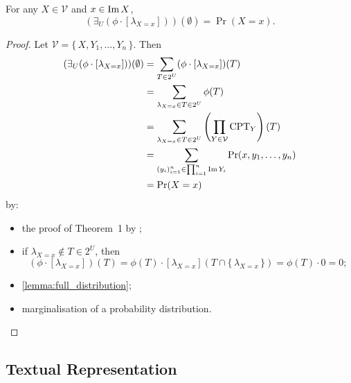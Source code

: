 \begin{theorem}\label{thm:correctness}
  For any $X \in \mathcal{V}$ and $x \in \operatorname{Im} X$,
  \[
    (\exists_U(\phi \cdot [\lambda_{X=x}]))(\emptyset) = \Pr(X = x).
  \]
\end{theorem}
\begin{proof}
  Let $\mathcal{V} = \{\, X, Y_1, \dots, Y_n \,\}$. Then
  \begin{align*}
    (\exists_U (\phi \cdot [\lambda_{X=x}]))(\emptyset) &= \sum_{T \in 2^U} (\phi \cdot [\lambda_{X=x}])(T) \\
                                                        &= \sum_{\lambda_{X=x} \in T \in 2^U} \phi(T) \\
                                                        &= \sum_{\lambda_{X=x} \in T \in 2^U} \left( \prod_{Y \in \mathcal{V}} \mathrm{CPT}_Y \right)(T) \\
                                                        &= \sum_{{(y_i)}_{i=1}^n \in \prod_{i=1}^n \operatorname{Im} Y_i} \Pr(x, y_1, \dots, y_n) \\
                                                        &= \Pr(X = x)
  \end{align*}
  by:
  \begin{itemize}
    \item the proof of Theorem~1 by \citet{DBLP:conf/aaai/DudekPV20};
    \item if $\lambda_{X=x} \not\in T \in 2^U$, then
    \[
      (\phi \cdot [\lambda_{X=x}])(T) = \phi(T) \cdot [\lambda_{X=x}](T \cap \{\, \lambda_{X=x} \,\}) = \phi(T) \cdot 0 = 0;
    \]
    \item \cref{lemma:full_distribution};
    \item marginalisation of a probability distribution.
  \end{itemize}
\end{proof}

\subsection{Textual Representation}\label{sec:textual_representation}

